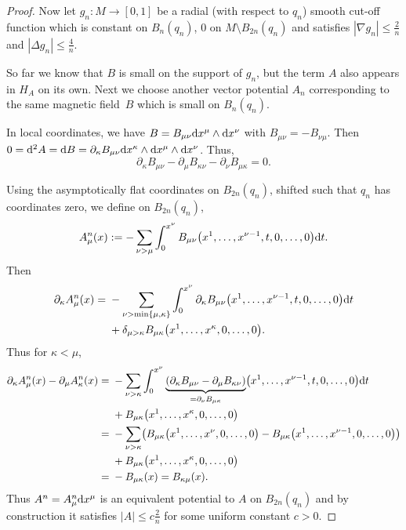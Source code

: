 \documentclass[10pt,a4paper]{amsart}
\numberwithin{equation}{section}
\begin{document}
\begin{proof}
Now let $g_n\colon M\to [0,1]$ be a radial (with respect to $q_n$) smooth cut-off function which is constant on $B_{n}(q_n)$, $0$ on $M\setminus B_{2n}(q_n)$ and satisfies $| \nabla g_n| \leq \frac{2}{n}$ and $|\Delta g_n| \leq \frac{4}{n}$.
	
So far we know that $B$ is small on the support of $g_n$, but the term $A$ also appears in $H_A$ on its own. Next we choose another vector potential $A_n$ corresponding to the same magnetic field~$B$ which is small on $B_{n}(q_n)$.
	
In local coordinates, we have $B=B_{\mu\nu} {\rm d}x^\mu \wedge {\rm d}x^\nu$ with $B_{\mu\nu}=-B_{\nu\mu}$. Then $0={\rm d}^2A={\rm d}B= \partial_\kappa B_{\mu\nu} {\rm d}x^\kappa \wedge {\rm d}x^\mu \wedge {\rm d}x^\nu$. Thus,
\[ \partial_\kappa B_{\mu\nu} - \partial_\mu B_{\kappa\nu} -\partial_\nu B_{\mu\kappa}=0.\]
	
Using the asymptotically flat coordinates on $B_{2n}(q_n)$, shifted such that $q_n$ has coordinates zero, we define on $B_{2n}(q_n)$,
\begin{align*}
A_\mu^n(x) := -\sum_{\nu>\mu} \int_0^{x^\nu} B_{\mu\nu}\bigl(x^1, \ldots, x^{\nu-1}, t, 0, \ldots, 0\bigr)  {\rm d}t.
\end{align*}	
Then
\begin{align*}
\partial_\kappa A_\mu^n(x) ={} & -\sum_{\nu>\min \{\mu, \kappa\}} \int_0^{x^\nu} \partial_\kappa B_{\mu\nu}\bigl(x^1, \ldots, x^{\nu-1}, t, 0, \ldots, 0\bigr) {\rm d}t\\& + \delta_{\mu>\kappa} B_{\mu\kappa}\bigl(x^1, \ldots, x^{\kappa}, 0, \ldots, 0\bigr). \end{align*}
Thus for $\kappa<\mu$,
\begin{align*}
\partial_\kappa A_\mu^n(x) - \partial_\mu A_\kappa^n(x)
={} & -\sum_{\nu> \kappa} \int_0^{x^\nu} \underbrace{(\partial_\kappa B_{\mu\nu} -\partial_\mu B_{\kappa\nu})}_{=\partial_\nu B_{\mu\kappa}}\bigl(x^1, \ldots, x^{\nu-1}, t, 0, \ldots, 0\bigr) {\rm d}t\\& + B_{\mu\kappa}\bigl(x^1, \ldots, x^{\kappa}, 0, \ldots, 0\bigr) \\
={} &- \sum_{\nu> \kappa} \bigl( B_{\mu\kappa}\bigl(x^1, \ldots, x^{\nu}, 0, \ldots, 0\bigr)- B_{\mu\kappa}\bigl(x^1, \ldots, x^{\nu-1}, 0, \ldots, 0\bigr) \bigr)\\&
+ B_{\mu\kappa}\bigl(x^1, \ldots, x^{\kappa}, 0, \ldots, 0\bigr) \\ ={}& -B_{\mu\kappa}(x)=B_{\kappa\mu}(x).
\end{align*}
Thus $A^n=A^n_\mu {\rm d}x^\mu$ is an equivalent potential to $A$ on $B_{2n}(q_n)$ and by construction it satisfies $|A|\leq c\frac{2}{n}$ for some uniform constant $c>0$.
		

\end{proof}
\end{document}
